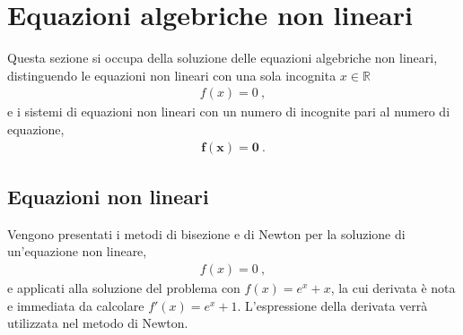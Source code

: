 \documentclass[letterpaper,10pt,english]{jupyterBook}
\begin{document}
\section{Equazioni algebriche non lineari}
\label{\detokenize{ch/numerics/nonlinear:equazioni-algebriche-non-lineari}}\label{\detokenize{ch/numerics/nonlinear::doc}}
\sphinxAtStartPar
Questa sezione si occupa della soluzione delle equazioni algebriche non lineari, distinguendo le equazioni non lineari con una sola incognita \(x \in \mathbb{R}\)
\begin{equation*}
\begin{split}f(x) = 0 \ ,\end{split}
\end{equation*}
\sphinxAtStartPar
e i sistemi di equazioni non lineari con un numero di incognite pari al numero di equazione,
\begin{equation*}
\begin{split}\mathbf{f}(\mathbf{x}) = \mathbf{0} \ .\end{split}
\end{equation*}

\subsection{Equazioni non lineari}
\label{\detokenize{ch/numerics/nonlinear:equazioni-non-lineari}}
\sphinxAtStartPar
Vengono presentati i metodi di bisezione e di Newton per la soluzione di un’equazione non lineare,
\begin{equation*}
\begin{split}f(x) = 0 \ ,\end{split}
\end{equation*}
\sphinxAtStartPar
e applicati alla soluzione del problema con \(f(x) = e^x + x\), la cui derivata è nota e immediata da calcolare \(f'(x) = e^x + 1\). L’espressione della derivata verrà utilizzata nel metodo di Newton.
\end{document}
